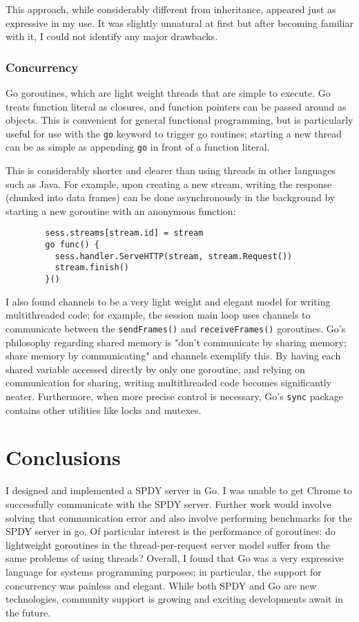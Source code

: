 \documentclass{article}
\begin{document}
This approach, while considerably different from inheritance, appeared just as expressive in my use. It was slightly unnatural at first but after becoming familiar with it, I could not identify any major drawbacks.

\subsubsection{Concurrency}
Go goroutines, which are light weight threads that are simple to execute.
Go treats function literal as closures, and function pointers can be passed around as objects. This is convenient for general functional programming, but is particularly useful for use with the \verb|go| keyword to trigger go routines; starting a new thread can be as simple as appending \verb|go| in front of a function literal. 

This is considerably shorter and clearer than using threads in other languages such as Java. For example, upon creating a new stream, writing the response (chunked into data frames) can be done asynchronously in the background by starting a new goroutine with an anonymous function:
\begin{verbatim}
        sess.streams[stream.id] = stream
        go func() {
          sess.handler.ServeHTTP(stream, stream.Request())
          stream.finish()
        }()
\end{verbatim}

I also found channels to be a very light weight and elegant model for writing multithreaded code; for example, the session main loop uses channels to communicate between the \verb|sendFrames()| and \verb|receiveFrames()| goroutines. Go's philosophy regarding shared memory is "don't communicate by sharing memory; share memory by communicating" and channels exemplify this. By having each shared variable accessed directly by only one goroutine, and relying on communication for sharing, writing multithreaded code becomes significantly neater. Furthermore, when more precise control is necessary, Go's \verb|sync| package contains other utilities like locks and mutexes.


\section{Conclusions}
  I designed and implemented a SPDY server in Go. I was unable to get Chrome to successfully communicate with the SPDY server. Further work would involve solving that communication error and also involve performing benchmarks for the SPDY server in go. Of particular interest is the performance of goroutines: do lightweight goroutines in the thread-per-request server model suffer from the same problems of using threads? 
  Overall, I found that Go was a very expressive language for systems programming purposes; in particular, the support for concurrency was painless and elegant. While both SPDY and Go are new technologies, community support is growing and exciting developments await in the future.
\end{document}
